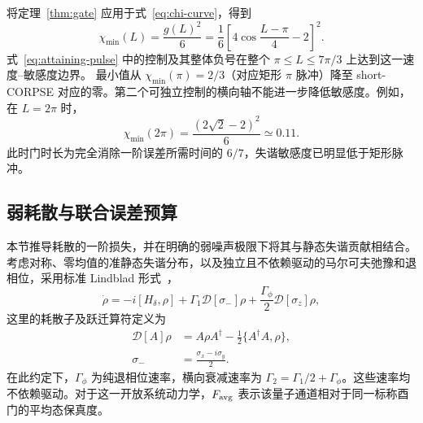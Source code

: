 \documentclass[12pt]{iopjournal}
\theoremstyle{definition}
\begin{document}
将定理~\ref{thm:gate} 应用于式~\eqref{eq:chi-curve}，得到
\begin{equation}
 \boxed{\chi_{\min}(L)=\frac{g(L)^2}{6}
 =\frac16\left[4\cos\frac{L-\pi}{4}-2\right]^2.}
 \label{eq:main}
\end{equation}
式~\eqref{eq:attaining-pulse} 中的控制及其整体负号在整个 $\pi\le L\le7\pi/3$ 上达到这一速度--敏感度边界。
最小值从 $\chi_{\min}(\pi)=2/3$（对应矩形 $\pi$ 脉冲）降至 short-CORPSE 对应的零。第二个可独立控制的横向轴不能进一步降低敏感度。例如，在 $L=2\pi$ 时，
\begin{equation*}
 \chi_{\min}(2\pi)
 =\frac{(2\sqrt2-2)^2}{6}\simeq0.11.
\end{equation*}
此时门时长为完全消除一阶误差所需时间的 $6/7$，失谐敏感度已明显低于矩形脉冲。

\FloatBarrier
\subsection{弱耗散与联合误差预算}

本节推导耗散的一阶损失，并在明确的弱噪声极限下将其与静态失谐贡献相结合。
考虑对称、零均值的准静态失谐分布，以及独立且不依赖驱动的马尔可夫弛豫和退相位，采用标准 Lindblad 形式~\cite{gorini1976,lindblad1976}，
\begin{equation}
 \dot\rho=-i[H_\delta,\rho]
 +\Gamma_1\mathcal D[\sigma_-]\rho
 +\frac{\Gamma_\phi}{2}\mathcal D[\sigma_z]\rho,
 \label{eq:lindblad}
\end{equation}
这里的耗散子及跃迁算符定义为
\begin{equation*}
 \begin{aligned}
 \mathcal D[A]\rho
   &=A\rho A^\dagger-\frac12\{A^\dagger A,\rho\},\\
 \sigma_-&=\frac{\sigma_x-i\sigma_y}{2}.
 \end{aligned}
\end{equation*}
在此约定下，$\Gamma_\phi$ 为纯退相位速率，横向衰减速率为 $\Gamma_2=\Gamma_1/2+\Gamma_\phi$。这些速率均不依赖驱动。对于这一开放系统动力学，$F_{\rm avg}$ 表示该量子通道相对于同一标称酉门的平均态保真度。
\end{document}
